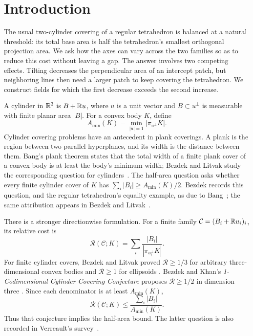 \section{Introduction}\label{c:introduction}

The usual two-cylinder covering of a regular tetrahedron is balanced
at a natural threshold: its total base area is half the tetrahedron's
smallest orthogonal projection area. We ask how the axes can vary across
the two families so as to reduce this cost without leaving a gap.
The answer involves two competing effects. Tilting decreases the
perpendicular area of an intercept patch, but neighboring lines then
need a larger patch to keep covering the tetrahedron. We construct
fields for which the first decrease exceeds the second increase.

A cylinder in $\mathbb R^3$ is $B+\mathbb R u$, where $u$ is a unit vector and
$B\subset u^\perp$ is measurable with finite planar area $|B|$.
For a convex body $K$, define
\[
 A_{\min}(K)=\min_{|u|=1}|\pi_{u^\perp}K|.
\]
Cylinder covering problems have an antecedent in plank coverings. A plank is the
region between two parallel hyperplanes, and its width is the distance
between them. Bang's plank theorem states that the total width of a
finite plank cover of a convex body is at least the body's minimum width;
Bezdek and Litvak study the corresponding question for
cylinders~\cite[Introduction]{BL2009}.
The half-area question asks whether every finite cylinder cover of $K$
has $\sum_i|B_i|\ge A_{\min}(K)/2$. Bezdek records this question,
and the regular tetrahedron's equality example, as due to
Bang~\cite[Problem~3.1]{Bezdek2009}; the same attribution appears in
Bezdek and Litvak~\cite{BL2009}.

There is a stronger directionwise formulation. For a finite family
$\mathcal C=(B_i+\mathbb R u_i)_i$, its relative cost is
\[
 \mathcal R(\mathcal C;K)
   =\sum_i\frac{|B_i|}{|\pi_{u_i^\perp}K|}.
\]
For finite cylinder covers, Bezdek and Litvak proved
$\mathcal R\ge1/3$ for arbitrary
three-dimensional convex bodies and $\mathcal R\ge1$ for ellipsoids
\cite[Theorem~3.1]{BL2009}. Bezdek and Khan's
\emph{1-Codimensional Cylinder Covering Conjecture} proposes
$\mathcal R\ge1/2$ in dimension three
\cite[Definition~3 and Conjecture~4.13]{BK2016}.
Since each denominator is at least $A_{\min}(K)$,
\begin{equation}\label{c:relative-comparison}
 \mathcal R(\mathcal C;K)
 \le\frac{\sum_i|B_i|}{A_{\min}(K)}.
\end{equation}
Thus that conjecture implies the half-area bound. The latter question
is also recorded in Verreault's survey~\cite[Question~4.14]{Verreault2026}.

